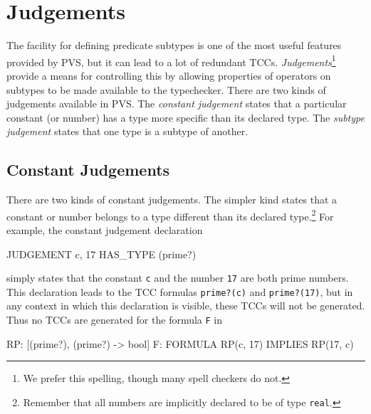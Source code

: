 \section{Judgements}
\label{judgements}

The facility for defining predicate subtypes is one of the most useful
features provided by PVS, but it can lead to a lot of redundant TCCs.
\emph{Judgements}\footnote{We prefer this spelling, though many spell
checkers do not.} provide a means for controlling this by allowing
properties of operators on subtypes to be made available to the
typechecker.  There are two kinds of judgements available in PVS\@.  The
\emph{constant judgement} states that a
particular constant (or number) has a type more specific than its declared
type.  The \emph{subtype judgement} states that
one type is a subtype of another.

\subsection{Constant Judgements}

There are two kinds of constant judgements.  The simpler kind 
states that a constant or number belongs to a type different than its
declared type.\footnote{Remember that all numbers are implicitly declared to
be of type \texttt{real}.}  For example, the constant judgement
declaration
\begin{pvsex}
  JUDGEMENT c, 17 HAS_TYPE (prime?)
\end{pvsex}
simply states that the constant \texttt{c} and the number \texttt{17} are
both prime numbers.  This declaration leads to the TCC formulas
\texttt{prime?(c)} and \texttt{prime?(17)}, but in any context in which
this declaration is visible, these TCCs will not be generated.  Thus no
TCCs are generated for the formula \texttt{F} in
\begin{pvsex}
  RP: [(prime?), (prime?) -> bool]
  F: FORMULA RP(c, 17) IMPLIES RP(17, c)
\end{pvsex}

